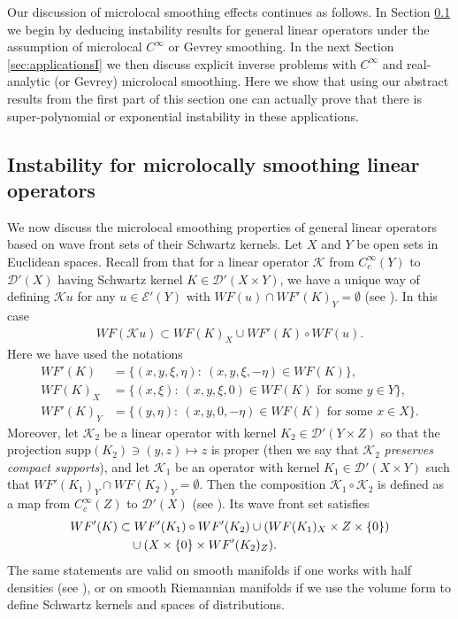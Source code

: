 \documentclass[12pt,twoside]{amsart}
\numberwithin{equation}{section}
\begin{document}
Our discussion of microlocal smoothing effects continues as follows. In Section \ref{sec:micro_abstract} we begin by deducing instability results for general linear operators under the assumption of microlocal $C^{\infty}$ or Gevrey smoothing. In the next Section \ref{sec:applicationsI} we then discuss explicit inverse problems with $C^{\infty}$ and real-analytic (or Gevrey) microlocal smoothing. Here we show that using our abstract results from the first part of this section one can actually prove that there is super-polynomial or exponential instability in these applications.


\subsection{Instability for microlocally smoothing linear operators}
\label{sec:micro_abstract}

We now discuss the microlocal smoothing properties of general linear operators based on wave front sets of their Schwartz kernels. Let $X$ and $Y$ be open sets in Euclidean spaces. Recall from \cite[Section 8.2]{Hoermander} that for a linear operator $\mathcal{K}$ from $C_c^{\infty}(Y)$ to $\mathcal{D}'(X)$ having Schwartz kernel $K \in \mathcal{D}'(X \times Y)$, we have a unique way of defining $\mathcal{K} u$ for any $u\in \mathcal{E}'(Y)$ with $WF(u)\cap WF'(K)_Y = \emptyset$ (see \cite[Theorem 8.2.13]{Hoermander}). In this case
\begin{align*}
WF(\mathcal{K} u) \subset WF(K)_X \cup WF'(K)\circ WF(u).
\end{align*} 
Here we have used the notations 
\begin{align*}
WF'(K)&=\{(x,y,\xi,\eta): \ (x,y,\xi,-\eta)\in WF(K)\},\\
WF(K)_X&= \{(x,\xi): \ (x,y,\xi,0)\in WF(K)\mbox{ for some } y \in Y\},\\
WF'(K)_Y&= \{(y,\eta): \ (x,y,0,-\eta)\in WF(K) \mbox{ for some } x \in X\}.
\end{align*}
Moreover, let $\mathcal{K}_2$ be a linear operator with kernel $K_2 \in \mathcal{D}'(Y\times Z)$ so that the projection $\mathrm{supp}(K_2) \ni (y,z) \mapsto z$ is proper (then we say that $\mathcal{K}_2$ \emph{preserves compact supports}), and let $\mathcal{K}_1$ be an operator with kernel $K_1 \in \mathcal{D}'(X\times Y)$ such that $WF'(K_1)_Y \cap WF(K_2)_Y = \emptyset$. Then the composition $\mathcal{K}_1\circ \mathcal{K}_2$ is defined as a map from $C_c^{\infty}(Z)$ to $\mathcal{D}'(X)$ (see \cite[Theorem 8.2.14]{Hoermander}). Its wave front set satisfies
\begin{align}
WF'(K) &\subset WF'(K_1)\circ WF'(K_2) \cup(WF(K_1)_X \times Z \times \{0\}) \notag \\
& \quad \cup(X \times \{0\}\times WF'(K_2)_{Z}). \label{wf_composition_formula}
\end{align}
The same statements are valid on smooth manifolds if one works with half densities (see \cite[Section 2.5]{Hormander_FIO1}), or on smooth Riemannian manifolds if we use the volume form to define Schwartz kernels and spaces of distributions.
\end{document}
